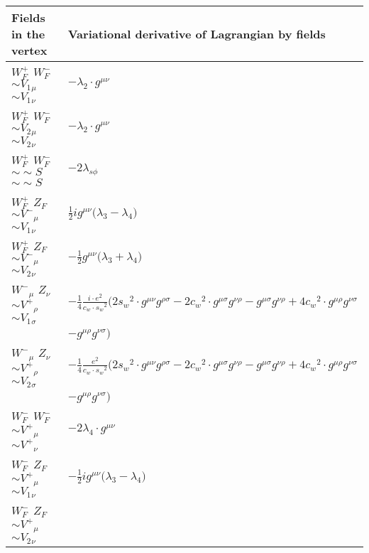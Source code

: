 \begin{center}
\begin{tabular}{|l|l|} \hline
Fields in the vertex & Variational derivative of Lagrangian by fields \\ \hline
$W^+_F{}_{}$ \phantom{-} $W^-_F{}_{}$ \phantom{-} $\sim V_1{}_{\mu }$ \phantom{-} $\sim V_1{}_{\nu }$ \phantom{-}  &
	$- \lambda_2\cdot g^{\mu \nu} $\\[2mm]
$W^+_F{}_{}$ \phantom{-} $W^-_F{}_{}$ \phantom{-} $\sim V_2{}_{\mu }$ \phantom{-} $\sim V_2{}_{\nu }$ \phantom{-}  &
	$- \lambda_2\cdot g^{\mu \nu} $\\[2mm]
$W^+_F{}_{}$ \phantom{-} $W^-_F{}_{}$ \phantom{-} $\sim\sim S{}_{}$ \phantom{-} $\sim\sim S{}_{}$ \phantom{-}  &
	$-2 \lambda_{s\phi}$\\[2mm]
$W^+_F{}_{}$ \phantom{-} $Z_F{}_{}$ \phantom{-} $\sim V^-{}_{\mu }$ \phantom{-} $\sim V_1{}_{\nu }$ \phantom{-}  &
	$\frac{1}{2} ig^{\mu \nu} \big( \lambda_3- \lambda_4\big)$\\[2mm]
$W^+_F{}_{}$ \phantom{-} $Z_F{}_{}$ \phantom{-} $\sim V^-{}_{\mu }$ \phantom{-} $\sim V_2{}_{\nu }$ \phantom{-}  &
	$-\frac{1}{2}g^{\mu \nu} \big( \lambda_3+ \lambda_4\big)$\\[2mm]
$W^-{}_{\mu }$ \phantom{-} ${Z}_{\nu }$ \phantom{-} $\sim V^+{}_{\rho }$ \phantom{-} $\sim V_1{}_{\sigma }$ \phantom{-}  &
	$-\frac{1}{4}\frac{ i \cdot e{}^2 }{ c_w \cdot s_w{}^2 }\big(2 s_w{}^2 \cdot g^{\mu \nu} g^{\rho \sigma} -2 c_w{}^2 \cdot g^{\mu \sigma} g^{\nu \rho} -g^{\mu \sigma} g^{\nu \rho} +4 c_w{}^2 \cdot g^{\mu \rho} g^{\nu \sigma} $ \\[2mm]
  & $-g^{\mu \rho} g^{\nu \sigma} \big)$\\[2mm]
$W^-{}_{\mu }$ \phantom{-} ${Z}_{\nu }$ \phantom{-} $\sim V^+{}_{\rho }$ \phantom{-} $\sim V_2{}_{\sigma }$ \phantom{-}  &
	$-\frac{1}{4}\frac{ e{}^2 }{ c_w \cdot s_w{}^2 }\big(2 s_w{}^2 \cdot g^{\mu \nu} g^{\rho \sigma} -2 c_w{}^2 \cdot g^{\mu \sigma} g^{\nu \rho} -g^{\mu \sigma} g^{\nu \rho} +4 c_w{}^2 \cdot g^{\mu \rho} g^{\nu \sigma} $ \\[2mm]
  & $-g^{\mu \rho} g^{\nu \sigma} \big)$\\[2mm]
$W^-_F{}_{}$ \phantom{-} $W^-_F{}_{}$ \phantom{-} $\sim V^+{}_{\mu }$ \phantom{-} $\sim V^+{}_{\nu }$ \phantom{-}  &
	$-2 \lambda_4\cdot g^{\mu \nu} $\\[2mm]
$W^-_F{}_{}$ \phantom{-} $Z_F{}_{}$ \phantom{-} $\sim V^+{}_{\mu }$ \phantom{-} $\sim V_1{}_{\nu }$ \phantom{-}  &
	$-\frac{1}{2} ig^{\mu \nu} \big( \lambda_3- \lambda_4\big)$\\[2mm]
$W^-_F{}_{}$ \phantom{-} $Z_F{}_{}$ \phantom{-} $\sim V^+{}_{\mu }$ \phantom{-} $\sim V_2{}_{\nu }$ \phantom{-}  &

\end{tabular}
\end{center}
